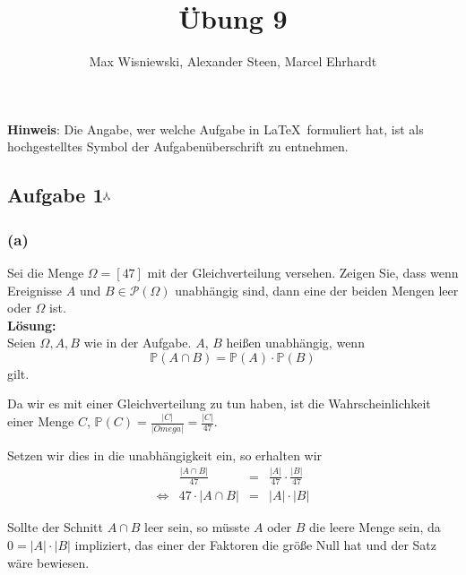 \documentclass[11pt,a4paper,ngerman]{article}
\date{}
\title{Übung 9}
\author{Max Wisniewski\maxw, Alexander Steen\alex, Marcel Ehrhardt\marcel}
\newcommand{\Prob}{\mathbb{P}}
\newcommand{\maxw}{$^\curlywedgedownarrow$}
\begin{document}

\renewcommand{\figurename}{Figure}

\maketitle
\thispagestyle{fancy}

\begin{center}
\textbf{Hinweis}: Die Angabe, wer welche Aufgabe in \LaTeX\ formuliert hat, ist als hochgestelltes Symbol der Aufgabenüberschrift zu entnehmen.
\end{center}


\subsection*{Aufgabe 1\maxw}

\subsubsection*{(a)}
Sei die Menge $\Omega = [47]$ mit der Gleichverteilung versehen. Zeigen Sie, dass wenn Ereignisse $A$ und $B \in \mathcal{P}(\Omega)$ unabhängig sind,
dann eine der beiden Mengen leer oder $\Omega$ ist.\\

\textbf{Lösung:}\\

Seien $\Omega, A, B$ wie in der Aufgabe. $A$, $B$ heißen unabhängig, wenn
\[
    \Prob(A \cap B) = \Prob(A) \cdot \Prob(B)
\]
gilt.

Da wir es mit einer Gleichverteilung zu tun haben, ist die Wahrscheinlichkeit einer Menge $C$, $\Prob(C) = \frac{|C|}{|Omega|} = \frac{|C|}{47}$.

Setzen wir dies in die unabhängigkeit ein, so erhalten wir
\[
    \begin{array}{lrcl}
        &\frac{\left| A \cap B \right|}{47} &=& \frac{|A|}{47} \cdot \frac{|B|}{47}\\
        \Leftrightarrow & 47 \cdot \left| A \cap B \right| &=& |A| \cdot |B|
    \end{array}
\]

Sollte der Schnitt $A \cap B$ leer sein, so müsste $A$ oder $B$ die leere Menge sein, da $0 = |A| \cdot |B|$ impliziert, das einer der Faktoren die größe Null hat
und der Satz wäre bewiesen.\\
\end{document}
